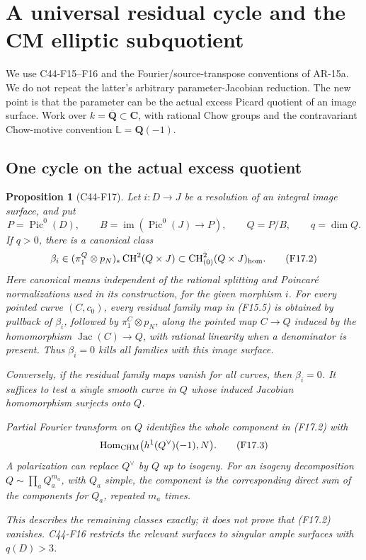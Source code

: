 \documentclass[11pt]{article}
\newtheorem{proposition}[theorem]{Proposition}
\theoremstyle{remark}\newtheorem{remark}[theorem]{Remark}
\begin{document}


\section{A universal residual cycle and the CM elliptic subquotient}

We use C44-F15--F16 and the Fourier/source-transpose conventions of
AR-15a.  We do not repeat the latter's arbitrary parameter-Jacobian
reduction.  The new point is that the parameter can be the actual
excess Picard quotient of an image surface.  Work over
$k=\overline{\mathbf Q}\subset\mathbf C$, with rational Chow groups
and the contravariant Chow-motive convention
$\mathbb L=\mathbf Q(-1)$.

\subsection{One cycle on the actual excess quotient}

\begin{proposition}[C44-F17]\label{C44-F17}
Let $i:D\to J$ be a resolution of an integral image surface, and
put
\[
 P=\operatorname{Pic}^0(D),\qquad
 B=\operatorname{im}(\operatorname{Pic}^0(J)\to P),\qquad
 Q=P/B,\qquad q=\dim Q.
 \tag{F17.1}
\]
If $q>0$, there is a canonical class
\[
 \beta_i\in
 (\pi_1^Q\otimes p_N)_*\operatorname{CH}^2(Q\times J)
 \subset\operatorname{CH}^2_{(0)}(Q\times J)_{\rm hom}.
 \tag{F17.2}
\]
Here canonical means independent of the rational splitting and
Poincar\'e normalizations used in its construction, for the given
morphism $i$.  For every pointed curve $(C,c_0)$, every residual
family map in (F15.5) is obtained by pullback of $\beta_i$,
followed by $\pi_1^C\otimes p_N$, along the pointed map
$C\to Q$ induced by the homomorphism
$\operatorname{Jac}(C)\to Q$, with rational linearity when a
denominator is present.  Thus $\beta_i=0$ kills all families with
this image surface.

Conversely, if the residual family maps vanish for all curves,
then $\beta_i=0$.  It suffices to test a single smooth curve in
$Q$ whose induced Jacobian homomorphism surjects onto $Q$.

Partial Fourier transform on $Q$ identifies the whole component
in (F17.2) with
\[
 \operatorname{Hom}_{\rm CHM}
       \bigl(h^1(Q^\vee)(-1),N\bigr).
 \tag{F17.3}
\]
A polarization can replace $Q^\vee$ by $Q$ up to isogeny.
For an isogeny decomposition $Q\sim\prod_a Q_a^{m_a}$, with
$Q_a$ simple, the component is the corresponding direct sum
of the components for $Q_a$, repeated $m_a$ times.

This describes the remaining classes exactly; it does not prove
that (F17.2) vanishes.  C44-F16 restricts the relevant surfaces
to singular ample surfaces with $q(D)>3$.
\end{proposition}
\end{document}
